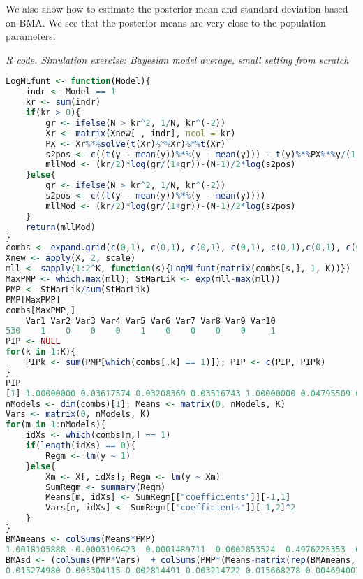 We also show how to estimate the posterior mean and standard deviation based on BMA. We see that the posterior means are very close to the population parameters.  

\begin{tcolorbox}[enhanced,width=4.67in,center upper,
	fontupper=\large\bfseries,drop shadow southwest,sharp corners]
	\textit{R code. Simulation exercise: Bayesian model average, small setting from scratch}
	\begin{VF}
		\begin{lstlisting}[language=R]
LogMLfunt <- function(Model){
	indr <- Model == 1
	kr <- sum(indr)
	if(kr > 0){
		gr <- ifelse(N > kr^2, 1/N, kr^(-2))
		Xr <- matrix(Xnew[ , indr], ncol = kr)
		PX <- Xr%*%solve(t(Xr)%*%Xr)%*%t(Xr)
		s2pos <- c((t(y - mean(y))%*%(y - mean(y))) - t(y)%*%PX%*%y/(1 + gr))
		mllMod <- (kr/2)*log(gr/(1+gr))-(N-1)/2*log(s2pos)
	}else{
		gr <- ifelse(N > kr^2, 1/N, kr^(-2))
		s2pos <- c((t(y - mean(y))%*%(y - mean(y))))
		mllMod <- (kr/2)*log(gr/(1+gr))-(N-1)/2*log(s2pos)
	}
	return(mllMod)
}
combs <- expand.grid(c(0,1), c(0,1), c(0,1), c(0,1), c(0,1),c(0,1), c(0,1), c(0,1), c(0,1), c(0,1))
Xnew <- apply(X, 2, scale)
mll <- sapply(1:2^K, function(s){LogMLfunt(matrix(combs[s,], 1, K))})
MaxPMP <- which.max(mll); StMarLik <- exp(mll-max(mll))
PMP <- StMarLik/sum(StMarLik)
PMP[MaxPMP]
combs[MaxPMP,]
    Var1 Var2 Var3 Var4 Var5 Var6 Var7 Var8 Var9 Var10
530    1    0    0    0    1    0    0    0    0     1
PIP <- NULL
for(k in 1:K){
	PIPk <- sum(PMP[which(combs[,k] == 1)]); PIP <- c(PIP, PIPk)
}
PIP
[1] 1.00000000 0.03617574 0.03208369 0.03516743 1.00000000 0.04795509 0.03457102 0.03468819 0.03510209 1.00000000
nModels <- dim(combs)[1]; Means <- matrix(0, nModels, K)
Vars <- matrix(0, nModels, K)
for(m in 1:nModels){
	idXs <- which(combs[m,] == 1)
	if(length(idXs) == 0){
		Regm <- lm(y ~ 1)
	}else{
		Xm <- X[, idXs]; Regm <- lm(y ~ Xm)
		SumRegm <- summary(Regm)
		Means[m, idXs] <- SumRegm[["coefficients"]][-1,1]
		Vars[m, idXs] <- SumRegm[["coefficients"]][-1,2]^2 
	}
}
BMAmeans <- colSums(Means*PMP)
1.0018105888 -0.0003196423  0.0001489711  0.0002853524  0.4976225353 -0.0007229563  0.0005342718  0.0005441905  0.0005758708 -0.7035206822
BMAsd <- (colSums(PMP*Vars)  + colSums(PMP*(Means-matrix(rep(BMAmeans, each = nModels), nModels, K))^2))^0.5
0.015274980 0.003304115 0.002814491 0.003214722 0.015668278 0.004694003 0.006400541 0.006435695 0.006528471 0.030940753 
\end{lstlisting}
	\end{VF}
\end{tcolorbox} 

